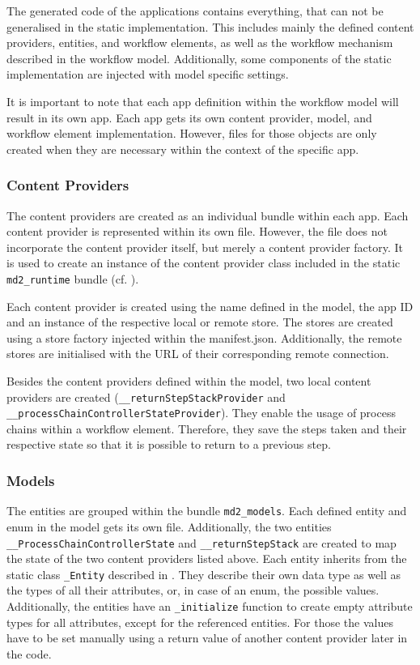 The generated code of the \mapapps applications contains everything, that can not be generalised in the static implementation. This includes mainly the defined content providers, entities, and workflow elements, as well as the workflow mechanism described in the workflow model. Additionally, some components of the static \mapapps implementation are injected with model specific settings.

It is important to note that each app definition within the workflow model will result in its own app. Each app gets its own content provider, model, and workflow element implementation. However, files for those objects are only created when they are necessary within the context of the specific app.

\subsubsection{Content Providers}
The content providers are created as an individual bundle within each app. Each content provider is represented within its own file. However, the file does not incorporate the content provider itself, but merely a content provider factory. It is used to create an instance of the content provider class included in the static \lstinline|md2_runtime| bundle (cf. ).

Each content provider is created using the name defined in the model, the app ID and an instance of the respective local or remote store. The stores are created using a store factory injected within the manifest.json.
Additionally, the remote stores are initialised with the URL of their corresponding remote connection.

Besides the content providers defined within the model, two local content providers are created (\lstinline|__returnStepStackProvider| and \lstinline|__processChainControllerStateProvider|). They enable the usage of process chains within a workflow element. Therefore, they save the steps taken and their respective state so that it is possible to return to a previous step.

\subsubsection{Models}

The entities are grouped within the bundle \lstinline|md2_models|. Each defined entity and enum in the model gets its own file. Additionally, the two entities \lstinline|__ProcessChainControllerState| and \lstinline|__returnStepStack| are created to map the state of the two content providers listed above. Each entity inherits from the static class \lstinline|_Entity| described in . They describe their own data type as well as the types of all their attributes, or, in case of an enum, the possible values. Additionally, the entities have an \lstinline|_initialize| function to create empty attribute types for all attributes, except for the referenced entities. For those the values have to be set manually using a return value of another content provider later in the code.

